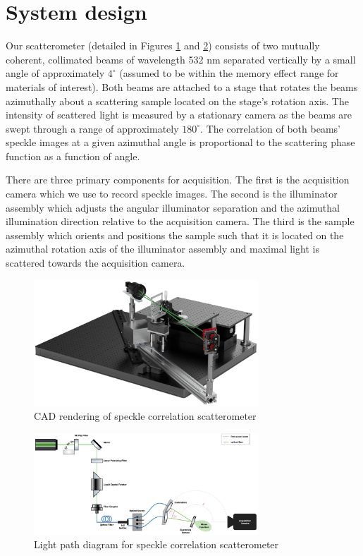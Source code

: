 \section{System design}
Our scatterometer (detailed in Figures \ref{fig:cad} and \ref{fig:light_path}) consists of two mutually coherent, collimated beams of wavelength 532 nm separated vertically by a small angle of approximately $4^\circ$ (assumed to be within the memory effect range for materials of interest). Both beams are attached to a stage that rotates the beams azimuthally about a scattering sample located on the stage's rotation axis. The intensity of scattered light is measured by a stationary camera as the beams are swept through a range of approximately $180^\circ$. The correlation of both beams' speckle images at a given azimuthal angle is proportional to the scattering phase function as a function of angle.

There are three primary components for acquisition. The first is the acquisition camera which we use to record speckle images. The second is the illuminator assembly which adjusts the angular illuminator separation and the azimuthal illumination direction relative to the acquisition camera. The third is the sample assembly which orients and positions the sample such that it is located on the azimuthal rotation axis of the illuminator assembly and maximal light is scattered towards the acquisition camera.
\begin{figure}
    \centering
    \includegraphics[width=0.75\textwidth]{../figures/setup.png}
    \caption{CAD rendering of speckle correlation scatterometer}
    \label{fig:cad}
\end{figure}

\begin{figure}
    \centering
    \includegraphics[width=0.75\textwidth]{../figures/laser_path.png}
    \caption{Light path diagram for speckle correlation scatterometer}
    \label{fig:light_path}
\end{figure}

